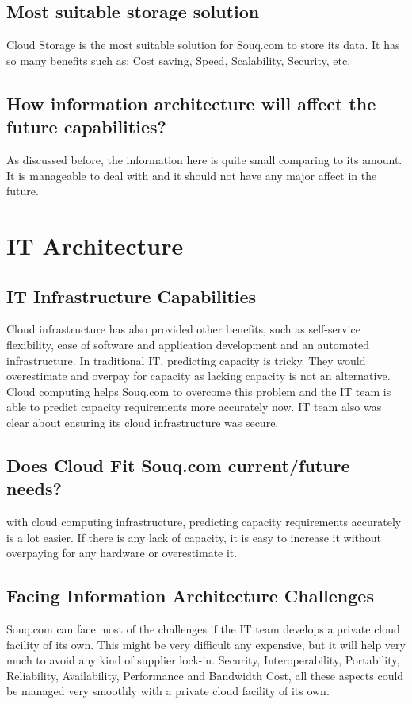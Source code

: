 \documentclass{book}
\begin{document}
\section{Most suitable storage solution}
Cloud Storage is the most suitable solution for Souq.com to store its data. It has so many benefits such as: Cost saving, Speed, Scalability, Security, etc.\\

\section{How information architecture will affect the future capabilities?}
As discussed before, the information here is quite small comparing to its amount. It is manageable to deal with and it should not have any major affect in the future.\\

\chapter{IT Architecture}
\section{IT Infrastructure Capabilities}
Cloud infrastructure has also provided other benefits, such as self-service flexibility, ease of software and application development and an automated infrastructure. In traditional IT, predicting capacity is tricky. They would overestimate and overpay for capacity as lacking capacity is not an alternative. Cloud computing helps Souq.com to overcome this problem and the IT team is able to predict capacity requirements more accurately now. IT team also was clear about ensuring its cloud infrastructure was secure.

\section{Does Cloud Fit Souq.com current/future needs?}
with cloud computing infrastructure, predicting capacity requirements accurately is a lot easier. If there is any lack of capacity, it is easy to increase it without overpaying for any hardware or overestimate it.

\section{Facing Information Architecture Challenges}
Souq.com can face most of the challenges if the IT team develops a private cloud facility of its own. This might be very difficult any expensive, but it will help very much to avoid any kind of supplier lock-in. Security, Interoperability, Portability, Reliability, Availability, Performance and Bandwidth Cost, all these aspects could be managed very smoothly with a private cloud facility of its own.
\end{document}
